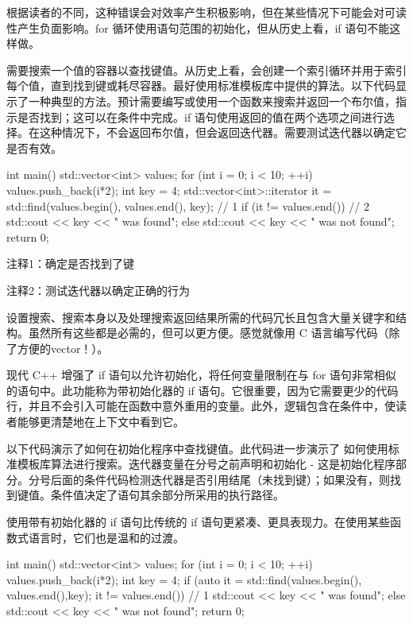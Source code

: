 根据读者的不同，这种错误会对效率产生积极影响，但在某些情况下可能会对可读性产生负面影响。for 循环使用语句范围的初始化，但从历史上看，if 语句不能这样做。


需要搜索一个值的容器以查找键值。从历史上看，会创建一个索引循环并用于索引每个值，直到找到键或耗尽容器。最好使用标准模板库中提供的算法。以下代码显示了一种典型的方法。预计需要编写或使用一个函数来搜索并返回一个布尔值，指示是否找到；这可以在条件中完成。if 语句使用返回的值在两个选项之间进行选择。在这种情况下，不会返回布尔值，但会返回迭代器。需要测试迭代器以确定它是否有效。


\begin{cpp}
int main() {
  std::vector<int> values;
  for (int i = 0; i < 10; ++i)
    values.push_back(i*2);
  int key = 4;
  std::vector<int>::iterator it =
  std::find(values.begin(), values.end(), key); // 1
  if (it != values.end()) // 2
    std::cout << key << " was found\n";
  else
    std::cout << key << " was not found\n";
  return 0;
}
\end{cpp}

{\footnotesize
注释1：确定是否找到了键

注释2：测试迭代器以确定正确的行为
}


设置搜索、搜索本身以及处理搜索返回结果所需的代码冗长且包含大量关键字和结构。虽然所有这些都是必需的，但可以更方便。感觉就像用 C 语言编写代码（除了方便的vector！）。


现代 C++ 增强了 if 语句以允许初始化，将任何变量限制在与 for 语句非常相似的语句中。此功能称为带初始化器的 if 语句。它很重要，因为它需要更少的代码行，并且不会引入可能在函数中意外重用的变量。此外，逻辑包含在条件中，使读者能够更清楚地在上下文中看到它。

以下代码演示了如何在初始化程序中查找键值。此代码进一步演示了 如何使用标准模板库算法进行搜索。迭代器变量在分号之前声明和初始化 - 这是初始化程序部分。分号后面的条件代码检测迭代器是否引用结尾（未找到键）；如果没有，则找到键值。条件值决定了语句其余部分所采用的执行路径。

使用带有初始化器的 if 语句比传统的 if 语句更紧凑、更具表现力。在使用某些函数式语言时，它们也是温和的过渡。


\begin{cpp}
int main() {
  std::vector<int> values;
  for (int i = 0; i < 10; ++i)
    values.push_back(i*2);
  int key = 4;
  if (auto it = std::find(values.begin(),
        values.end(),key); it != values.end()) // 1
    std::cout << key << " was found\n";
  else
    std::cout << key << " was not found\n";
  return 0;
}
\end{cpp}

